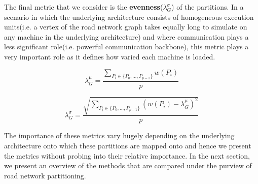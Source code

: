\noindent The final metric that we consider is the \textbf{evenness}($\lambda_G^\sigma$) of the partitions. In a scenario in which the underlying architecture consists of homogeneous execution units(i.e. a vertex of the road network graph takes equally long to simulate on any machine in the underlying architecture) and where communication plays a less significant role(i.e. powerful communication backbone), this metric plays a very important role as it defines how varied each machine is loaded.

\begin{equation}
\label{eq:metric3-mean}
\lambda_G^\mu = \frac{\sum\limits_{P_i \in \{P_0,\dots,P_{p-1}\}} w(P_i)}{p}
\end{equation}

\begin{equation}
\label{eq:metric3}
\lambda_G^\sigma = \frac{\sqrt{\sum\limits_{P_i \in \{P_0,\dots,P_{p-1}\}} (w(P_i) - \lambda_G^\mu)^2}}{p}
\end{equation}

\noindent The importance of these metrics vary hugely depending on the underlying architecture onto which these partitions are mapped onto and hence we present the metrics without probing into their relative importance. In the next section, we present an overview of the methods that are compared under the purview of road network partitioning.